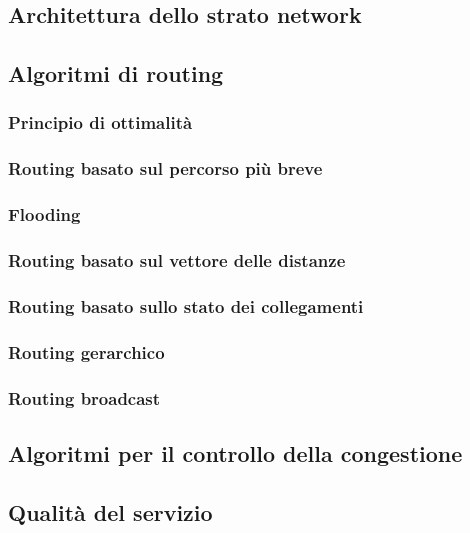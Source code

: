 \subsection{Architettura dello strato network}

\subsection{Algoritmi di routing} %

\subsubsection{Principio di ottimalità}

\subsubsection{Routing basato sul percorso più breve}

\subsubsection{Flooding}

\subsubsection{Routing basato sul vettore delle distanze}

\subsubsection{Routing basato sullo stato dei collegamenti} %

\subsubsection{Routing gerarchico}

\subsubsection{Routing broadcast}

\subsection{Algoritmi per il controllo della congestione} 

\subsection{Qualità del servizio}

